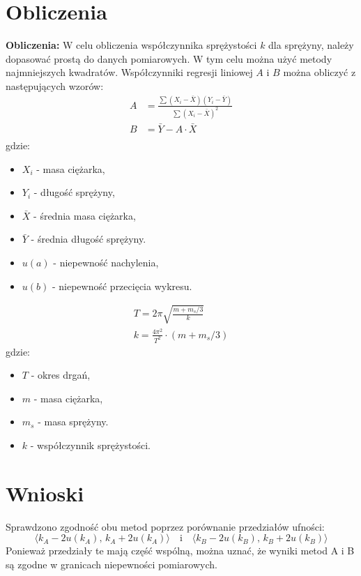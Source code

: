 \documentclass[12pt]{article}
\begin{document}
\section*{Obliczenia}
\textbf{Obliczenia:} W celu obliczenia współczynnika sprężystości \( k \) dla sprężyny, należy dopasować prostą do danych pomiarowych.
W tym celu można użyć metody najmniejszych kwadratów. Współczynniki regresji liniowej \( A \) i \( B \) można obliczyć z następujących wzorów:
\begin{align*}
A &= \frac{\sum (X_i - \bar{X})(Y_i - \bar{Y})}{\sum (X_i - \bar{X})^2} \\
B &= \bar{Y} - A \cdot \bar{X} \\
\end{align*}
gdzie:
\begin{itemize}
    \item \( X_i \) - masa ciężarka,
    \item \( Y_i \) - długość sprężyny,
    \item \( \bar{X} \) - średnia masa ciężarka,
    \item \( \bar{Y} \) - średnia długość sprężyny.
    \item \( u(a) \) - niepewność nachylenia,
    \item \( u(b) \) - niepewność przecięcia wykresu.
\end{itemize}
\begin{align*}
    T = 2\pi \sqrt{\frac{m + m_s/3}{k}} \\
    k = \frac{4\pi^2}{T^2} \cdot (m + m_s/3)
\end{align*}
gdzie:
\begin{itemize}
    \item \( T \) - okres drgań,
    \item \( m \) - masa ciężarka,
    \item \( m_s \) - masa sprężyny.
    \item \( k \) - współczynnik sprężystości.
\end{itemize}

\section*{Wnioski}
Sprawdzono zgodność obu metod poprzez porównanie przedziałów ufności:
\[
\langle k_A - 2u(k_A), \, k_A + 2u(k_A) \rangle \quad \text{i} \quad \langle k_B - 2u(k_B), \, k_B + 2u(k_B) \rangle
\]
Ponieważ przedziały te mają część wspólną, można uznać, że wyniki metod A i B są zgodne w granicach niepewności pomiarowych.
\end{document}
